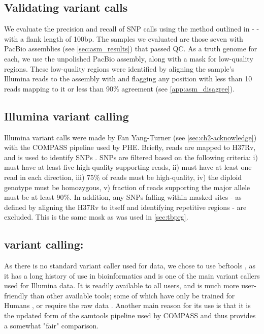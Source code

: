 \subsection{Validating variant calls}

We evaluate the precision and recall of SNP calls using the method outlined in  -  - with a flank length of 100bp. The samples we evaluated are those seven with PacBio assemblies (see \autoref{sec:asm_results}) that passed QC. As a truth genome for each, we use the unpolished  PacBio assembly, along with a mask for low-quality regions. These low-quality regions were identified by aligning the sample's Illumina reads to the assembly with  and flagging any position with less than 10 reads mapping to it or less than 90\% agreement (see \autoref{app:asm_disagree}). 

\subsection{Illumina variant calling}
\label{sec:illumina-var-call}

Illumina variant calls were made by Fan Yang-Turner (see \autoref{sec:ch2-acknowledge}) with the COMPASS pipeline used by PHE. Briefly, reads are mapped to H37Rv, and  is used to identify SNPs \cite{samtools2009}. SNPs are filtered based on the following criteria: i) must have at least five high-quality supporting reads, ii) must have at least one read in each direction, iii) 75\% of reads must be high-quality, iv) the diploid genotype must be homozygous, v) fraction of reads supporting the major allele must be at least 90\%. In addition, any SNPs falling within masked sites - as defined by aligning the H37Rv to itself and identifying repetitive regions \cite{tbmask2014} - are excluded. This is the same mask as was used in \autoref{sec:tbprg}.

\subsection{\ont{} variant calling: }
\label{sec:bcftools-filters}

As there is no standard variant caller used for \mtb{} \ont{} data, we chose to use bcftools \cite{bcftools2021}, as it has a long history of use in bioinformatics and is one of the main variant callers used for Illumina data. It is readily available to all users, and is much more user-friendly than other available tools; some of which have only be trained for Humans \cite{clair2020}, or require the raw \ont{} data \cite{nanopolish2015}. Another main reason for its use is that it is the updated form of the samtools pipeline used by COMPASS and thus provides a somewhat "fair" comparison.

